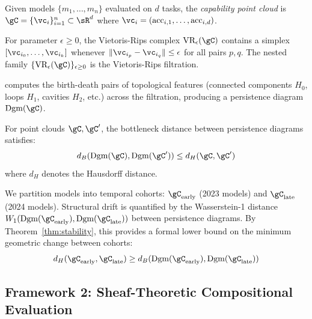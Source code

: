 \begin{definition}
Given models $\{m_1, \ldots, m_n\}$ evaluated on $d$ tasks, the \emph{capability point cloud} is $\gC = \{\vc_i\}_{i=1}^n \subset \sR^d$ where $\vc_i = (\text{acc}_{i,1}, \ldots, \text{acc}_{i,d})$.
\end{definition}

\begin{definition}
For parameter $\epsilon \geq 0$, the Vietoris-Rips complex $\text{VR}_\epsilon(\gC)$ contains a simplex $[\vc_{i_0}, \ldots, \vc_{i_k}]$ whenever $\|\vc_{i_p} - \vc_{i_q}\| \leq \epsilon$ for all pairs $p, q$.
The nested family $\{\text{VR}_\epsilon(\gC)\}_{\epsilon \geq 0}$ is the Vietoris-Rips filtration.
\end{definition}

\PH computes the birth-death pairs of topological features (connected components $H_0$, loops $H_1$, cavities $H_2$, etc.) across the filtration, producing a persistence diagram $\text{Dgm}(\gC)$.

\begin{theorem}
\label{thm:stability}
For point clouds $\gC, \gC'$, the bottleneck distance between persistence diagrams satisfies:
\begin{equation}
d_B(\text{Dgm}(\gC), \text{Dgm}(\gC')) \leq d_H(\gC, \gC')
\end{equation}
where $d_H$ denotes the Hausdorff distance.
\end{theorem}

We partition models into temporal cohorts: $\gC_{\text{early}}$ (2023 models) and $\gC_{\text{late}}$ (2024 models).
Structural drift is quantified by the Wasserstein-1 distance $W_1(\text{Dgm}(\gC_{\text{early}}), \text{Dgm}(\gC_{\text{late}}))$ between persistence diagrams.
By Theorem~\ref{thm:stability}, this provides a formal lower bound on the minimum geometric change between cohorts:
\begin{equation}
d_H(\gC_{\text{early}}, \gC_{\text{late}}) \geq d_B(\text{Dgm}(\gC_{\text{early}}), \text{Dgm}(\gC_{\text{late}}))
\end{equation}

\subsection{Framework 2: Sheaf-Theoretic Compositional Evaluation}
\label{sec:sheafeval}

